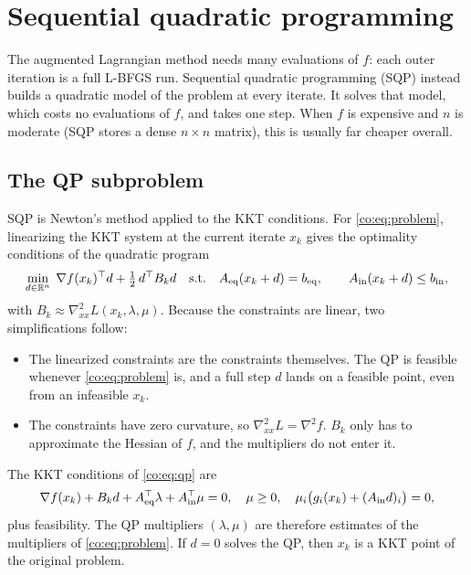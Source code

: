 \section{Sequential quadratic programming}\label{co:sec:sqp}

The augmented Lagrangian method needs many evaluations of $f$: each outer
iteration is a full L-BFGS run. Sequential quadratic programming (SQP)
instead builds a quadratic model of the problem at every iterate. It solves
that model, which costs no evaluations of $f$, and takes one step. When $f$
is expensive and $n$ is moderate (SQP stores a dense $n\times n$ matrix),
this is usually far cheaper overall.

\subsection{The QP subproblem}
SQP is Newton's method applied to the KKT conditions. For
\eqref{co:eq:problem}, linearizing the KKT system at the current iterate $x_k$
gives the optimality conditions of the quadratic program
\begin{equation}\label{co:eq:qp}
  \min_{d\in\mathbb{R}^n}\; \nabla f(x_k)^\top d + \tfrac12\, d^\top B_k d
  \quad\text{s.t.}\quad
  A_{\mathrm{eq}}(x_k+d) = b_{\mathrm{eq}},\qquad A_{\mathrm{in}}(x_k+d)\le b_{\mathrm{in}},
\end{equation}
with $B_k\approx\nabla^2_{xx}L(x_k,\lambda,\mu)$. Because the constraints are
linear, two simplifications follow:
\begin{itemize}
  \item The linearized constraints are the constraints themselves. The QP is
        feasible whenever \eqref{co:eq:problem} is, and a full step $d$ lands
        on a feasible point, even from an infeasible $x_k$.
  \item The constraints have zero curvature, so
        $\nabla^2_{xx}L=\nabla^2 f$. $B_k$ only has to approximate the
        Hessian of $f$, and the multipliers do not enter it.
\end{itemize}
The KKT conditions of \eqref{co:eq:qp} are
\[
  \nabla f(x_k) + B_k d + A_{\mathrm{eq}}^\top\lambda + A_{\mathrm{in}}^\top\mu = 0,\quad
  \mu\ge 0,\quad \mu_i\big(g_i(x_k)+(A_{\mathrm{in}} d)_i\big)=0,
\]
plus feasibility. The QP multipliers $(\lambda,\mu)$ are therefore estimates of
the multipliers of \eqref{co:eq:problem}. If $d=0$ solves the QP, then $x_k$ is
a KKT point of the original problem.

